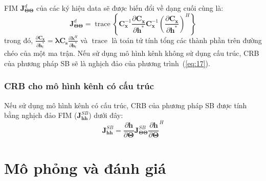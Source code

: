 FIM $\mathbf{J}_{\boldsymbol{\Theta} \boldsymbol{\Theta}}^{d}$ của các ký hiệu data sẽ được biến đổi về dạng cuối cùng là:
\begin{equation}
    \mathbf{J}_{\boldsymbol{\Theta} \boldsymbol{\Theta}}^{d}=\operatorname{trace}\left\{\mathbf{C}_{\mathbf{x}}^{-1} \frac{\partial \mathbf{C}_{\mathbf{x}}}{\partial \mathbf{h}^{*}} \mathbf{C}_{\mathbf{x}}^{-1}\left(\frac{\partial \mathbf{C}_{\mathbf{x}}}{\partial \mathbf{h}^{*}}\right)^{H}\right\}
\end{equation}
trong đó, $\frac{\partial \mathbf{C}_{\mathbf{x}}}{\partial \mathbf{h}_{t}^{*}}=\boldsymbol{\lambda} \mathbf{C}_{\mathbf{s}} \frac{\partial \boldsymbol{\lambda}^{H}}{\partial \mathbf{h}_{t}^{*}}$ và $\operatorname{trace}$ là toán tử tính tổng các thành phần trên đường chéo của một ma trận. Nếu sử dụng mô hình kênh không sử dụng cấu trúc, CRB của phương pháp SB sẽ là nghịch đảo của phương trình~(\ref{eq:17}). 

\subsubsection*{\textbf{CRB cho mô hình kênh có cấu trúc}}

Nếu sử dụng mô hình kênh có cấu trúc, CRB của phương pháp SB được tính bằng nghịch đảo FIM ($\mathbf{J}^{SB}_{\mathbf{h} \mathbf{h}}$) dưới đây:
\begin{equation}
\label{eq:SB_MRE}
    \mathbf{J}^{SB}_{\mathbf{h} \mathbf{h}}=\frac{\partial \mathbf{h}}{\partial \boldsymbol{\Theta}} \mathbf{J}^{SB}_{\boldsymbol{\Theta} \boldsymbol{\Theta}} {\frac{\partial \mathbf{h}}{\partial \boldsymbol{\Theta}}}^{H}
\end{equation}

\section{Mô phỏng và đánh giá}\label{SR}

